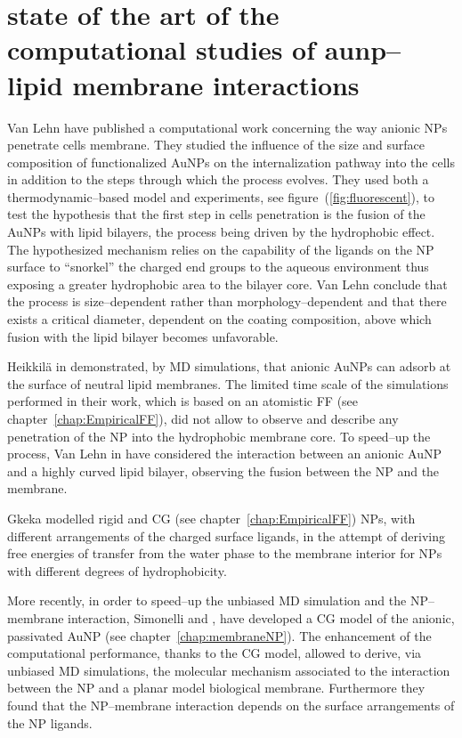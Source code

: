 \section{state of the art of the computational studies of aunp--lipid membrane interactions}
Van Lehn \etal{} have published a computational work \cite{VanLehn2013} concerning the way anionic \acp{NP} penetrate cells membrane. They studied the influence of the size and surface composition of functionalized \acp{AuNP} on the internalization pathway into the cells in addition to the steps through which the process evolves. They used both a thermodynamic--based model and experiments, see figure~(\ref{fig:fluorescent}), to test the hypothesis that the first step in cells penetration is the fusion of the \acp{AuNP} with lipid bilayers, the process being driven by the hydrophobic effect. The hypothesized mechanism relies on the capability of the ligands on the \ac{NP} surface to ``snorkel'' the charged end groups to the aqueous environment thus exposing a greater hydrophobic area to the bilayer core. Van Lehn \etal{} conclude that the process is size--dependent rather than morphology--dependent and that there exists a critical diameter, dependent on the coating composition, above which fusion with the lipid bilayer becomes unfavorable.

Heikkilä \etal{} in \cite{Heikkila2014} demonstrated, by \ac{MD} simulations, that anionic \acp{AuNP} can adsorb at the surface of neutral lipid membranes. The limited time scale of the simulations performed in their work, which is based on an atomistic \ac{FF} (see chapter~\ref{chap:EmpiricalFF}), did not allow to observe and describe any penetration of the \ac{NP} into the hydrophobic membrane core. To speed--up the process, Van Lehn \etal{} in \cite{VanLehn2014} have considered the interaction between an anionic \ac{AuNP} and a highly curved lipid bilayer, observing the fusion between the \ac{NP} and the membrane.

Gkeka \etal{} modelled rigid \cite{Gkeka2013} and \ac{CG} \cite{Gkeka2014} (see chapter~\ref{chap:EmpiricalFF}) \acp{NP}, with different arrangements of the charged surface ligands, in the attempt of deriving free energies of transfer from the water phase to the membrane interior for \acp{NP} with different degrees of hydrophobicity.

More recently, in order to speed--up the unbiased \ac{MD} simulation and the \ac{NP}--membrane interaction, Simonelli \etal{} \cite{simonelliThesis} and \cite{ourPaper}, have developed a \ac{CG} model of the anionic, passivated \ac{AuNP} (see chapter~\ref{chap:membraneNP}). The enhancement of the computational performance, thanks to the \ac{CG} model, allowed to derive, via unbiased \ac{MD} simulations, the molecular mechanism associated to the interaction between the \ac{NP} and a planar model biological membrane. Furthermore they found that the \ac{NP}--membrane interaction depends on the surface arrangements of the \ac{NP} ligands.

